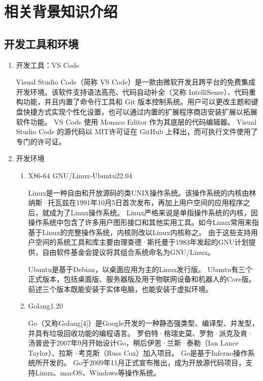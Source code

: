 \section{相关背景知识介绍}

	\subsection{开发工具和环境}
  
  	\begin{enumerate}[fullwidth,itemindent=2em,listparindent=2em]

  		\item 开发工具：VS Code
  		
		Visual Studio Code（简称 VS Code）是一款由微软开发且跨平台的免费集成开发环境。该软件支持语法高亮、代码自动补全（又称 IntelliSense）、代码重构功能，并且内置了命令行工具和 Git 版本控制系统。用户可以更改主题和键盘快捷方式实现个性化设置，也可以通过内置的扩展程序商店安装扩展以拓展软件功能。
		VS Code 使用 Monaco Editor 作为其底层的代码编辑器。
		Visual Studio Code 的源代码以 MIT许可证在 GitHub 上释出，而可执行文件使用了专门的许可证。
			
		\item 开发环境
			\begin{enumerate}
				\item X86-64 GNU/Linux-Ubuntu22.04
				
				Linux是一种自由和开放源码的类UNIX操作系统。该操作系统的内核由林纳斯·托瓦兹在1991年10月5日首次发布，再加上用户空间的应用程序之后，就成为了Linux操作系统。
				Linux严格来说是单指操作系统的内核，因操作系统中包含了许多用户图形接口和其他实用工具。如今Linux常用来指基于Linux的完整操作系统，内核则改以Linux内核称之。
				由于这些支持用户空间的系统工具和库主要由理查德·斯托曼于1983年发起的GNU计划提供，自由软件基金会提议将其组合系统命名为GNU/Linux。
				
				Ubuntu是基于Debian，以桌面应用为主的Linux发行版。
				Ubuntu有三个正式版本，包括桌面版、服务器版及用于物联网设备和机器人的Core版。
				前述三个版本既能安装于实体电脑，也能安装于虚拟环境。
				
				\item Golang1.20
				
				Go（又称Golang[4]）是Google开发的一种静态强类型、编译型、并发型，并具有垃圾回收功能的编程语言。
				罗伯特·格瑞史莫、罗勃·派克及肯·汤普逊于2007年9月开始设计Go，稍后伊恩·兰斯·泰勒（Ian Lance Taylor）、拉斯·考克斯（Russ Cox）加入项目。
				Go是基于Inferno操作系统所开发的。
				Go于2009年11月正式宣布推出，成为开放源代码项目，支持Linux、macOS、Windows等操作系统。
			

\end{enumerate}
\end{enumerate}
